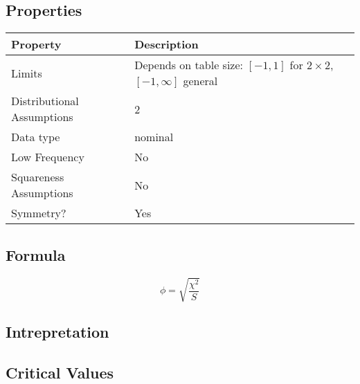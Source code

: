 \documentclass[11pt]{article}
\begin{document}
\subsection{Properties}
\begin{tabular}{| l || l |}
    \hline
    {\bf Property} & {\bf Description} \\
    \hline
    Limits & Depends on table size: $[-1, 1]$ for $2\times 2$, $[-1, \infty]$ general \\ \hline

    Distributional Assumptions& 2 \\ \hline

    Data type & nominal \\ \hline

    Low Frequency & No \\ \hline

    Squareness Assumptions & No \\ \hline
    
    Symmetry? & Yes \\ \hline

\end{tabular}


\subsection{Formula}
$$
\phi = \sqrt{ \frac{\chi^2}{S} }
$$

\subsection{Intrepretation}

\subsection{Critical Values}
\end{document}
